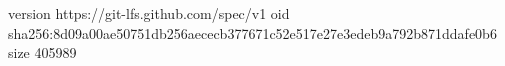 version https://git-lfs.github.com/spec/v1
oid sha256:8d09a00ae50751db256aececb377671c52e517e27e3edeb9a792b871ddafe0b6
size 405989

